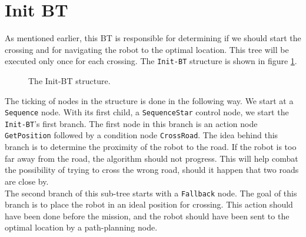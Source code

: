 \section{Init BT}
\label{sec:Init-BT}
    As mentioned earlier, this BT is responsible for determining if we should start the crossing and for navigating the robot to the optimal location. This tree will be executed only once for each crossing. The \texttt{Init-BT} structure is shown in figure \ref{fig:Init-BT}.\\
    \begin{figure}[ht]
        \caption{The Init-BT structure.}
        \label{fig:Init-BT}
    \end{figure}
    The ticking of nodes in the structure is done in the following way. We start at a \texttt{Sequence} node. With its first child, a \texttt{SequenceStar} control node, we start the \texttt{Init-BT}'s first branch. The first node in this branch is an action node \texttt{GetPosition} followed by a condition node \texttt{CrossRoad}. The idea behind this branch is to determine the proximity of the robot to the road. If the robot is too far away from the road, the algorithm should not progress. This will help combat the possibility of trying to cross the wrong road, should it happen that two roads are close by.\\
    The second branch of this sub-tree starts with a \texttt{Fallback} node. The goal of this branch is to place the robot in an ideal position for crossing. This action should have been done before the mission, and the robot should have been sent to the optimal location by a path-planning node.\\
